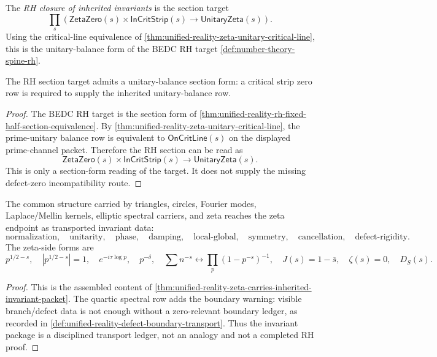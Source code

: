 \begin{definition}
\label{def:unified-reality-rh-closure-inherited-invariants}
The \emph{RH closure of inherited invariants} is the section target
$$
\prod_s
\left(
\mathsf{ZetaZero}(s)\times\mathsf{InCritStrip}(s)
\to
\mathsf{UnitaryZeta}(s)
\right).
$$
Using the critical-line equivalence of
\autoref{thm:unified-reality-zeta-unitary-critical-line}, this is the
unitary-balance form of the BEDC RH target
\autoref{def:number-theory-spine-rh}.
\end{definition}

\begin{theorem}
\label{thm:unified-reality-rh-closure-inherited-unitary-balance}
The RH section target admits a unitary-balance section form: a critical
strip zero row is required to supply the inherited unitary-balance row.
\end{theorem}

\begin{proof}
The BEDC RH target is the section form of
\autoref{thm:unified-reality-rh-fixed-half-section-equivalence}. By
\autoref{thm:unified-reality-zeta-unitary-critical-line}, the
prime-unitary balance row is equivalent to $\mathsf{OnCritLine}(s)$ on
the displayed prime-channel packet. Therefore the RH section can be read
as
$$
\mathsf{ZetaZero}(s)\times\mathsf{InCritStrip}(s)
\to
\mathsf{UnitaryZeta}(s).
$$
This is only a section-form reading of the target. It does not supply
the missing defect-zero incompatibility route.
\end{proof}

\begin{theorem}
\label{thm:unified-reality-zeta-inherited-invariant-principle}
The common structure carried by triangles, circles, Fourier modes,
Laplace/Mellin kernels, elliptic spectral carriers, and zeta reaches the
zeta endpoint as transported invariant data:
$$
\text{normalization},
\quad
\text{unitarity},
\quad
\text{phase},
\quad
\text{damping},
\quad
\text{local-global},
\quad
\text{symmetry},
\quad
\text{cancellation},
\quad
\text{defect-rigidity}.
$$
The zeta-side forms are
$$
p^{1/2-s},
\quad
|p^{1/2-s}|=1,
\quad
e^{-i\tau\log p},
\quad
p^{-\delta},
\quad
\sum n^{-s}\leftrightarrow\prod_p(1-p^{-s})^{-1},
\quad
J(s)=1-\overline{s},
\quad
\zeta(s)=0,
\quad
D_S(s).
$$
\end{theorem}

\begin{proof}
This is the assembled content of
\autoref{thm:unified-reality-zeta-carries-inherited-invariant-packet}.
The quartic spectral row adds the boundary warning: visible
branch/defect data is not enough without a zero-relevant boundary
ledger, as recorded in
\autoref{def:unified-reality-defect-boundary-transport}. Thus the
invariant package is a disciplined transport ledger, not an analogy and
not a completed RH proof.
\end{proof}
